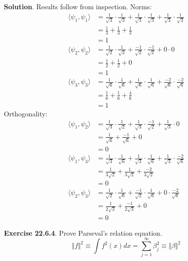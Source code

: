 \textbf{Solution}. Results follow from inspection.
Norms:
\begin{align*}
\langle \psi_{1}, \psi_{1} \rangle 
&= \frac{1}{\sqrt{3}} \cdot \frac{1}{\sqrt{3}} + \frac{1}{\sqrt{3}} \cdot \frac{1}{\sqrt{3}} + \frac{1}{\sqrt{3}} \cdot \frac{1}{\sqrt{3}} 
\\
&= \frac{1}{3} + \frac{1}{3} + \frac{1}{3} 
\\
&= 1 
\\
\langle \psi_{2}, \psi_{2} \rangle 
&= \frac{1}{\sqrt{2}} \cdot \frac{1}{\sqrt{2}} + \frac{-1}{\sqrt{2}} \cdot \frac{-1}{\sqrt{2}} + 0 \cdot 0 
\\
&= \frac{1}{2} + \frac{1}{2} + 0 
\\
&= 1 
\\
\langle \psi_{3}, \psi_{3} \rangle 
&= \frac{1}{\sqrt{6}} \cdot \frac{1}{\sqrt{6}} + \frac{1}{\sqrt{6}} \cdot \frac{1}{\sqrt{6}} + \frac{-2}{\sqrt{6}} \cdot \frac{-2}{\sqrt{6}}
\\ 
&= \frac{1}{6} + \frac{1}{6} + \frac{4}{6} 
\\
&= 1
\end{align*}
Orthogonality: \begin{align*}
\langle \psi_{1}, \psi_{2} \rangle 
&= \frac{1}{\sqrt{3}} \cdot \frac{1}{\sqrt{2}} + \frac{1}{\sqrt{3}} \cdot \frac{-1}{\sqrt{2}} + \frac{1}{\sqrt{3}} \cdot 0 
\\
&= \frac{1}{\sqrt{6}} + \frac{-1}{\sqrt{6}} + 0 
\\
&= 0 
\\
\langle \psi_{1}, \psi_{3} \rangle 
&= \frac{1}{\sqrt{3}} \cdot \frac{1}{\sqrt{6}} + \frac{1}{\sqrt{3}} \cdot \frac{1}{\sqrt{6}} + \frac{1}{\sqrt{3}} \cdot \frac{-2}{\sqrt{6}} 
\\
&= \frac{1}{3\sqrt{2}} + \frac{1}{3\sqrt{2}} + \frac{-2}{3\sqrt{2}} 
\\
&= 0 
\\
\langle \psi_{2}, \psi_{3} \rangle 
&= \frac{1}{\sqrt{2}} \cdot \frac{1}{\sqrt{6}} + \frac{-1}{\sqrt{2}} \cdot \frac{1}{\sqrt{6}} + 0 \cdot \frac{-2}{\sqrt{6}} 
\\
&= \frac{1}{2\sqrt{3}} + \frac{-1}{2\sqrt{3}} + 0 
\\
&= 0 
\end{align*}

\textbf{Exercise 22.6.4}. Prove Parseval's relation equation.
\[
\Vert f \Vert^{2} \equiv \int f^{2}(x) dx = \sum_{j=1}^{\infty} \beta_{j}^{2} \equiv \Vert \beta \Vert^{2}
\]

